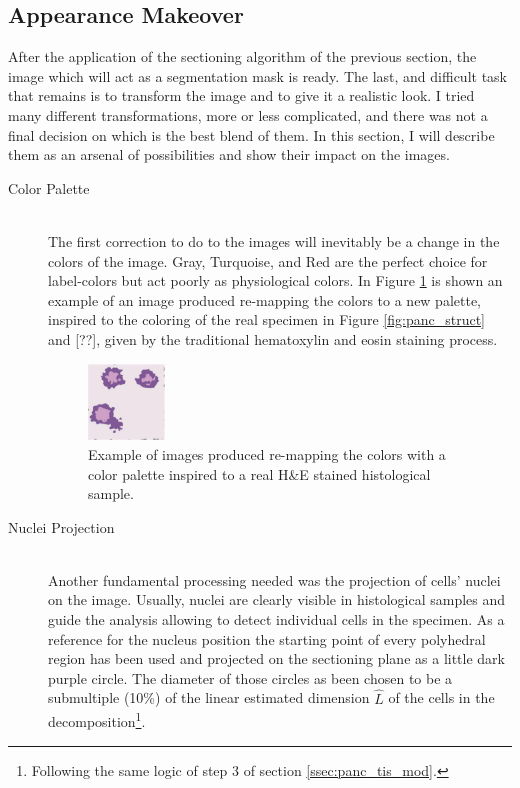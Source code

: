 \subsection{Appearance Makeover} \label{ssec:app_mkov}
After the application of the sectioning algorithm of the previous section, the image which will act as a segmentation mask is ready. The last, and difficult task that remains is to transform the image and to give it a realistic look. I tried many different transformations, more or less complicated, and there was not a final decision on which is the best blend of them. In this section, I will describe them as an arsenal of possibilities and show their impact on the images.

\begin{description}
    \item [Color Palette] \hfill \\
    The first correction to do to the images will inevitably be a change in the colors of the image. Gray, Turquoise, and Red are the perfect choice for label-colors but act poorly as physiological colors. In Figure \ref{fig:new_palette} is shown an example of an image produced re-mapping the colors to a new palette, inspired to the coloring of the real specimen in Figure \ref{fig:panc_struct} and [??], given by the traditional hematoxylin and eosin staining process.

    \begin{figure}[h]
        \centering
        \includegraphics[width = 0.2\textwidth]{images/new_palette}
        \caption{Example of images produced re-mapping the colors with a color palette inspired to a real H\&E stained histological sample.}
        \label{fig:new_palette}
    \end{figure}

    \item [Nuclei Projection] \hfill \\
    Another fundamental processing needed was the projection of cells' nuclei on the image. Usually, nuclei are clearly visible in histological samples and guide the analysis allowing to detect individual cells in the specimen. As a reference for the nucleus position the starting point of every polyhedral region has been used and projected on the sectioning plane as a little dark purple circle. The diameter of those circles as been chosen to be a submultiple (10\%) of the linear estimated dimension $\hat{L}$ of the cells in the decomposition\footnote{Following the same logic of step 3 of section \ref{ssec:panc_tis_mod}.}.


\end{description}
